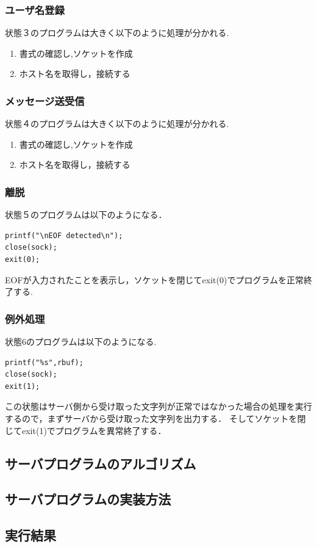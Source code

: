 \documentclass[dvipdfmx]{jarticle}
\begin{document}
\subsubsection{ユーザ名登録}
状態３のプログラムは大きく以下のように処理が分かれる.
\begin{enumerate}
    \item 書式の確認し,ソケットを作成
    \item ホスト名を取得し，接続する
\end{enumerate}
\subsubsection{メッセージ送受信}
状態４のプログラムは大きく以下のように処理が分かれる.
\begin{enumerate}
    \item 書式の確認し,ソケットを作成
    \item ホスト名を取得し，接続する
\end{enumerate}
\subsubsection{離脱}
状態５のプログラムは以下のようになる．
\begin{lstlisting}
printf("\nEOF detected\n");
close(sock);
exit(0);
\end{lstlisting}
EOFが入力されたことを表示し，ソケットを閉じてexit(0)でプログラムを正常終了する.
\subsubsection{例外処理}
状態6のプログラムは以下のようになる.
\begin{lstlisting}
printf("%s",rbuf);
close(sock);
exit(1);
\end{lstlisting}
この状態はサーバ側から受け取った文字列が正常ではなかった場合の処理を実行するので，まずサーバから受け取った文字列を出力する．
そしてソケットを閉じてexit(1)でプログラムを異常終了する．
\subsection{サーバプログラムのアルゴリズム}
\subsection{サーバプログラムの実装方法}
\subsection{実行結果}
\end{document}
